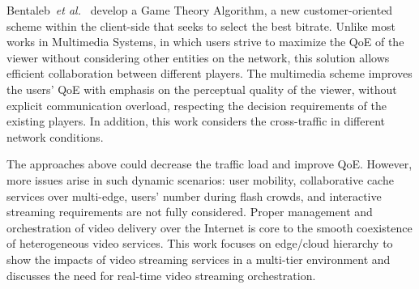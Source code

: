 Bentaleb~\textit{et al.}~\cite{bentaleb:2018:MSys} develop a Game Theory Algorithm, a new customer-oriented scheme within the client-side that seeks to select the best bitrate. Unlike most works in Multimedia Systems, in which users strive to maximize the QoE of the viewer without considering other entities on the network, this solution allows efficient collaboration between different players. The multimedia scheme improves the users' QoE with emphasis on the perceptual quality of the viewer, without explicit communication overload, respecting the decision requirements of the existing players. In addition, this work considers the cross-traffic in different network conditions.

The approaches above could decrease the traffic load and improve QoE. However, more issues arise in such dynamic scenarios: user mobility, collaborative cache services over multi-edge, users' number during flash crowds, and interactive streaming requirements are not fully considered.  Proper management and orchestration of video delivery over the Internet is core to the smooth coexistence of heterogeneous video services. This work focuses on edge/cloud hierarchy to show the impacts of video streaming services in a multi-tier environment and discusses the need for real-time video streaming orchestration.

%
%
